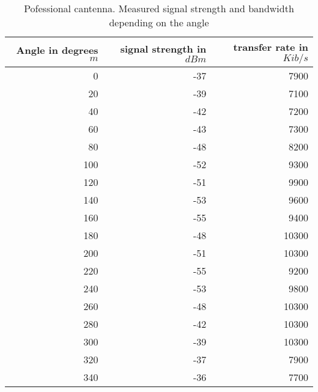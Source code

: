 \begin{table}
	\begin{center}
		\begin{tabular}{r|r|r}\
			Angle in degrees $m$ & signal strength in $dBm$ & transfer rate in $Kib/s$\\
			\hline 
			0 & -37 & 7900\\
			20 & -39 & 7100\\
			40 & -42 & 7200\\
			60 & -43 & 7300\\
			80 & -48 & 8200\\
			100 & -52 & 9300\\
			120 & -51 & 9900\\
			140 & -53 & 9600\\
			160 & -55 & 9400\\
			180 & -48 & 10300\\
			200 & -51 & 10300\\
			220 & -55 & 9200\\
			240 & -53 & 9800\\
			260 & -48 & 10300\\
			280 & -42 & 10300\\
			300 & -39 & 10300\\
			320 & -37 & 7900\\
			340 & -36 & 7700\\
		\end{tabular}
	\end{center}
	\caption{Pofessional cantenna. Measured signal strength and bandwidth depending on the angle}
	\label{ang:prof}
\end{table}

